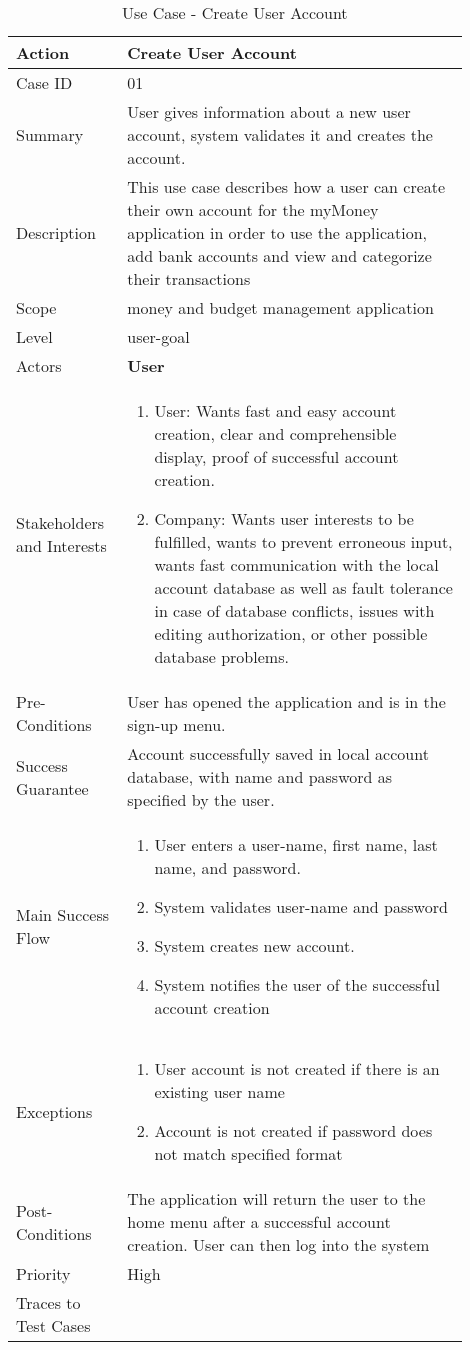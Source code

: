 \documentclass[11pt]{article}
\newcounter{use case ID}
\newcommand\tabularhead[1]{
\begin{table}[ht]
    \addtocounter{use case ID}{1}
    \caption{Use Case \arabic{use case ID} - #1}
    \vspace{0.2cm}
    \begin{tabular}{|p{0.2\linewidth}|p{0.70\linewidth}|}
    \hline
        \textbf{Action} & \textbf{#1} \\
        \hline}
\newcommand\addrow[2]{#1 & #2\\ \hline}
\newcommand\addmulrow[2]{ \begin{minipage}[t][][t]{2.5cm}#1\end{minipage}
        &\begin{minipage}[t][][t]{11cm}
        \begin{enumerate}[itemsep=-1ex] #2   \end{enumerate}
    \end{minipage}\vfill\\ \hline}
\newenvironment{usecase}{\tabularhead}
{\hline\end{tabular}\end{table}}
\begin{document}
\begin{usecase}{Create User Account}
    \addrow{Case ID}{01}
    \addrow{Summary}{User gives information about a new user account, system validates it and creates the account.}
    \addrow{Description} {This use case describes how a user can create their own account for the myMoney application in order to use the application, add bank accounts and view and categorize their transactions}
    \addrow{Scope}{money and budget management application}
    \addrow{Level}{user-goal}
    \addrow{Actors}{\textbf{User}}
    \addmulrow{Stakeholders and Interests}{
        \item User: Wants fast and easy account creation, clear and comprehensible display, proof of successful account creation.
        \item Company: Wants user interests to be fulfilled, wants to prevent erroneous input, wants fast communication with the local account database as well as fault tolerance in case of database conflicts, issues with editing authorization, or other possible database problems.}
    \addrow{Pre-Conditions}{User has opened the application and is in the sign-up menu.}
    \addrow{Success Guarantee}{Account successfully saved in local account database, with name and password as specified by the user.}
    \addmulrow{Main Success Flow}{
        \item User enters a user-name, first name, last name, and password.
        \item System validates user-name and password
        \item System creates new account.
        \item System notifies the user of the successful account creation}
    \addmulrow{Exceptions}{
    \item User account is not created if there is an existing user name 
    \item Account is not created if password does not match specified format}
    \addrow{Post-Conditions}{The application will return the user to the home menu after a successful account creation. User can then log into the system  }
    \addrow{Priority}{High}
    \addrow{Traces to Test Cases}{}
\end{usecase}
\end{document}
